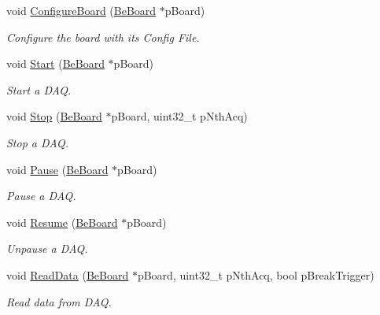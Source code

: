 \begin{DoxyCompactItemize}
void \hyperlink{class_ph2___hw_interface_1_1_be_board_interface_a808eabcbd850dd651f9b3122f702079f}{Configure\-Board} (\hyperlink{class_ph2___hw_description_1_1_be_board}{Be\-Board} $\ast$p\-Board)
\begin{DoxyCompactList}\small\item\em Configure the board with its Config File. \end{DoxyCompactList}\item 
void \hyperlink{class_ph2___hw_interface_1_1_be_board_interface_ac78a16fd4779f86c1224b09d30349e18}{Start} (\hyperlink{class_ph2___hw_description_1_1_be_board}{Be\-Board} $\ast$p\-Board)
\begin{DoxyCompactList}\small\item\em Start a D\-A\-Q. \end{DoxyCompactList}\item 
void \hyperlink{class_ph2___hw_interface_1_1_be_board_interface_a08d0374efe31d8078f8d31f58b709e6f}{Stop} (\hyperlink{class_ph2___hw_description_1_1_be_board}{Be\-Board} $\ast$p\-Board, uint32\-\_\-t p\-Nth\-Acq)
\begin{DoxyCompactList}\small\item\em Stop a D\-A\-Q. \end{DoxyCompactList}\item 
void \hyperlink{class_ph2___hw_interface_1_1_be_board_interface_a2b9692f018d7756fbfd720224da542da}{Pause} (\hyperlink{class_ph2___hw_description_1_1_be_board}{Be\-Board} $\ast$p\-Board)
\begin{DoxyCompactList}\small\item\em Pause a D\-A\-Q. \end{DoxyCompactList}\item 
void \hyperlink{class_ph2___hw_interface_1_1_be_board_interface_ad21d2651379571889a7a2ebc55ee3223}{Resume} (\hyperlink{class_ph2___hw_description_1_1_be_board}{Be\-Board} $\ast$p\-Board)
\begin{DoxyCompactList}\small\item\em Unpause a D\-A\-Q. \end{DoxyCompactList}\item 
void \hyperlink{class_ph2___hw_interface_1_1_be_board_interface_a3e5106285fa795c21cb9d20fbf753759}{Read\-Data} (\hyperlink{class_ph2___hw_description_1_1_be_board}{Be\-Board} $\ast$p\-Board, uint32\-\_\-t p\-Nth\-Acq, bool p\-Break\-Trigger)
\begin{DoxyCompactList}\small\item\em Read data from D\-A\-Q. \end{DoxyCompactList}\end{DoxyCompactItemize}

